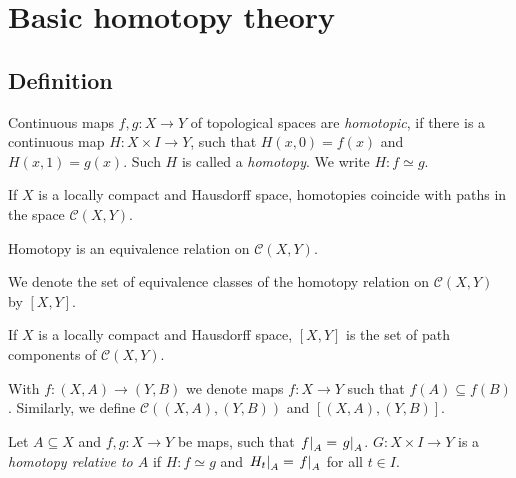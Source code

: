 \section{Basic homotopy theory}

\subsection{Definition}


\begin{definicija}
Continuous maps $f, g \colon X \to Y$ of topological spaces are
\emph{homotopic}, if there is a continuous map
$H \colon X \times I \to Y$, such that $H(x, 0) = f(x)$ and
$H(x, 1) = g(x)$. Such $H$ is called a
\emph{homotopy}. We write $H \colon f \simeq g$.
\end{definicija}

\begin{opomba}
If $X$ is a locally compact and Hausdorff space, homotopies
coincide with paths in the space $\mathcal{C}(X, Y)$.
\end{opomba}

\begin{trditev}
Homotopy is an equivalence relation on $\mathcal{C}(X, Y)$.
\end{trditev}

\obvs

\begin{definicija}
We denote the set of equivalence classes of the homotopy relation
on $\mathcal{C}(X, Y)$ by $[X, Y]$.
\end{definicija}

\begin{opomba}
If $X$ is a locally compact and Hausdorff space, $[X, Y]$ is the
set of path components of $\mathcal{C}(X, Y)$.
\end{opomba}

\begin{definicija}
With $f \colon (X, A) \to (Y, B)$ we denote maps $f \colon X \to Y$
such that $f(A) \subseteq f(B)$. Similarly, we define
$\mathcal{C}( (X, A), (Y, B))$ and $[(X,A), (Y,B)]$.
\end{definicija}

\begin{definicija}
Let $A \subseteq X$ and $f, g \colon X \to Y$ be maps, such that
$\left. f\right|_{A}^{} = \left. g\right|_{A}^{}$. $G \colon X \times I \to Y$ is a
\emph{homotopy relative to $A$}
if $H \colon f \simeq g$ and $\left. H_t\right|_{A}^{} = \left. f\right|_{A}^{}$ for
all $t \in I$.
\end{definicija}



